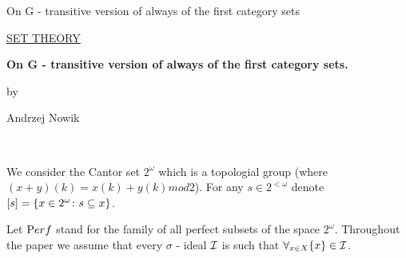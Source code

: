 \renewcommand\abstractname{Summary}

\pagestyle{myheadings}
{On G - transitive version of always of the first category sets}



{\parindent 12cm
\underline{\small SET THEORY}
}

\begin{center}{\bf \large
On G - transitive version of always of the first category sets.
}
\end{center}
\smallskip
\begin{center}
by
\end{center}
\smallskip
\begin{center}{\large Andrzej Nowik }
\end{center}
\bigskip
\begin{abstract}

  We study the $G-$ invariant version of always of
the first category sets.
  This notion is a generalization of the notion of
$\afcp$ sets.


\end{abstract}

\bigskip
\bigskip
\bigskip

\bigskip
{} \\
\bigskip

We consider the Cantor set $2^\omega$ 
which is a topologial group (where 
$(x+y)(k) = x(k) + y(k) \mathit{mod} 2$).
For any $s\in 2^{<\omega}$ denote 
$[s] = \{x\in2^{\omega}\colon s \subseteq x\}$.

Let ${\mathrm Perf}$ stand for the family of all perfect subsets of the space
$2^\omega$.
  Throughout the paper we assume that every $\sigma$ - ideal
${\cal I}$ is such that
  $\forall_{x\in X} \lbrace x \rbrace \in {\cal I}$.


